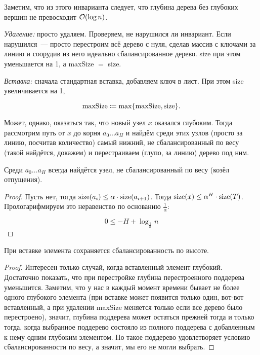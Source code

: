 Заметим, что из этого инварианта следует, что глубина дерева без глубоких вершин не превосходит $\mathcal{O}(\log n)$.

{\it Удаление:} просто удаляем. Проверяем, не нарушился ли инвариант. Если нарушился~--- просто перестроим всё дерево с нуля, сделав массив с ключами за линию и соорудив из него идеально сбалансированное дерево. size при этом уменьшается на 1, а maxSize $=$ size.

{\it Вставка:} сначала стандартная вставка, добавляем ключ в лист. При этом size увеличивается на 1,

\begin{equation*}
	\text{maxSize} \coloneqq \max \set*{\text{maxSize},\text{size}}.
\end{equation*}

Может, однако, оказаться так, что новый узел $x$ оказался глубоким. Тогда рассмотрим путь от $x$ до корня $a_0 \ldots a_{H}$ и найдём среди этих узлов (просто за линию, посчитав количество) самый нижний, не сбалансированный по весу (такой найдётся, докажем) и перестраиваем (глупо, за линию) дерево под ним.

\begin{theorem}
	Среди $a_0 \ldots a_{H}$ всегда найдётся узел, не сбалансированный по весу (козёл отпущения).
\end{theorem}

\begin{proof}
	Пусть нет, тогда $\operatorname{size} (a_i) \le \alpha \cdot \operatorname{size} (a_{i+1})$. Тогда $\operatorname{size} (x) \le \alpha^H \cdot \operatorname{size} (T)$. Прологарифмируем это неравенство по основанию $\frac{1}{\alpha}$:

	\begin{equation*}
		0 \le -H + \log_{\frac{1}{\alpha}} n
	\end{equation*}
\end{proof}

\begin{theorem}
	При вставке элемента сохраняется сбалансированность по высоте.
\end{theorem}
\begin{proof}
	Интересен только случай, когда вставленный элемент глубокий. Достаточно показать, что при перестройке глубина перестроенного поддерева уменьшится. Заметим, что у нас в каждый момент времени бывает не более одного глубокого элемента (при вставке может появится только один, вот-вот вставленный, а при удалении maxSize меняется только если все дерево было перестроено), значит, глубина поддерева может остаться прежней тогда и только тогда, когда выбранное поддерево состояло из полного поддерева с добавленным к нему одним глубоким элементом. Но такое поддерево удовлетворяет условию сбалансированности по весу, а значит, мы его не могли выбрать.
\end{proof}

